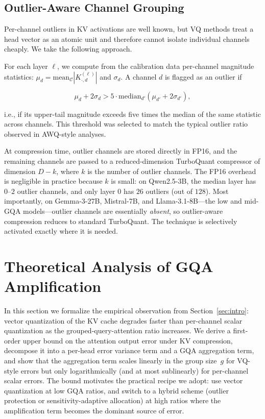 \documentclass[11pt]{article}
\begin{document}
\subsection{Outlier-Aware Channel Grouping}
\label{sec:outlier}

Per-channel outliers in KV activations are well known, but VQ methods treat a head vector as an atomic unit and therefore cannot isolate individual channels cheaply. We take the following approach.

For each layer $\ell$, we compute from the calibration data per-channel magnitude statistics: $\mu_d = \mathrm{mean}_\mathcal{C} |K^{(\ell)}_{\cdot, d}|$ and $\sigma_d$. A channel $d$ is flagged as an outlier if

\begin{equation}
\mu_d + 2 \sigma_d > 5 \cdot \mathrm{median}_{d'}(\mu_{d'} + 2 \sigma_{d'}),
\end{equation}

i.e., if its upper-tail magnitude exceeds five times the median of the same statistic across channels. This threshold was selected to match the typical outlier ratio observed in AWQ-style analyses.

At compression time, outlier channels are stored directly in FP16, and the remaining channels are passed to a reduced-dimension TurboQuant compressor of dimension $D - k$, where $k$ is the number of outlier channels. The FP16 overhead is negligible in practice because $k$ is small: on Qwen2.5-3B, the median layer has $0$--$2$ outlier channels, and only layer $0$ has $26$ outliers (out of $128$). Most importantly, on Gemma-3-27B, Mistral-7B, and Llama-3.1-8B---the low and mid-GQA models---outlier channels are essentially \emph{absent}, so outlier-aware compression reduces to standard TurboQuant. The technique is selectively activated exactly where it is needed.

\section{Theoretical Analysis of GQA Amplification}
\label{sec:theory}

In this section we formalize the empirical observation from
Section~\ref{sec:intro}: vector quantization of the KV cache degrades faster
than per-channel scalar quantization as the grouped-query-attention ratio
increases. We derive a first-order upper bound on the attention output error
under KV compression, decompose it into a per-head error variance term and a
GQA aggregation term, and show that the aggregation term scales linearly in
the group size~$g$ for VQ-style errors but only logarithmically (and at most
sublinearly) for per-channel scalar errors. The bound motivates the practical
recipe we adopt: use vector quantization at low GQA ratios, and switch to a
hybrid scheme (outlier protection or sensitivity-adaptive allocation) at high
ratios where the amplification term becomes the dominant source of error.
\end{document}
